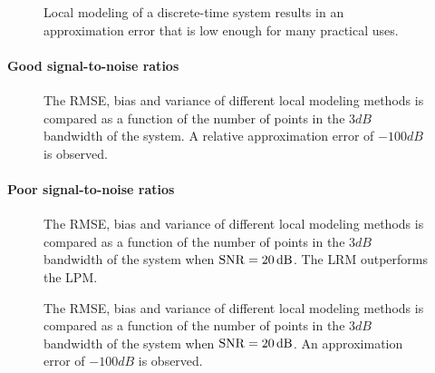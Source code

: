 \begin{figure}
  \centering
  \setlength{\figurewidth}{0.85\columnwidth}
  \setlength{\figureheight}{0.62\figurewidth}
  
  \caption[Comparison of local models for $\SNR = \infty$]{Local modeling of a discrete-time system results in an approximation error that is low enough for many practical uses.}
  \label{fig:nparam:comparison:noiseless}
\end{figure}

\paragraph{Good signal-to-noise ratios}

\begin{figure}
  \centering
  \setlength{\figurewidth}{0.85\columnwidth}
  \setlength{\figureheight}{0.62\figurewidth}
  
  \caption[Comparison of local models for $\SNR = 60 \unit{dB}$]{The \gls{RMSE}, bias and variance of different local modeling methods is compared as a function of the number of points in the $3\unit{dB}$ bandwidth of the system. A relative approximation error of $-100 \unit{dB}$ is observed.}
  \label{fig:nparam:comparison:hiSNR}
\end{figure}

\paragraph{Poor signal-to-noise ratios}
\begin{figure}
  \centering
  \setlength{\figurewidth}{0.85\columnwidth}
  \setlength{\figureheight}{0.62\figurewidth}
  
  \caption[Comparison of local models for $\SNR = 20 \unit{dB}$]{The \gls{RMSE}, bias and variance of different local modeling methods is compared as a function of the number of points in the $3\unit{dB}$ bandwidth of the system when $\SNR = 20\unit{dB}$. The \gls{LRM} outperforms the \gls{LPM}.}
  \label{fig:nparam:comparison:lowSNR}
\end{figure}

\begin{figure}
  \centering
  \setlength{\figurewidth}{0.85\columnwidth}
  \setlength{\figureheight}{0.62\figurewidth}
  
  \caption[Comparison of local models for $\SNR = 10 \unit{dB}$]{The \gls{RMSE}, bias and variance of different local modeling methods is compared as a function of the number of points in the $3\unit{dB}$ bandwidth of the system when $\SNR = 20\unit{dB}$. An approximation error of $-100 \unit{dB}$ is observed.}
  \label{fig:nparam:comparison:terribleSNR}
\end{figure}

